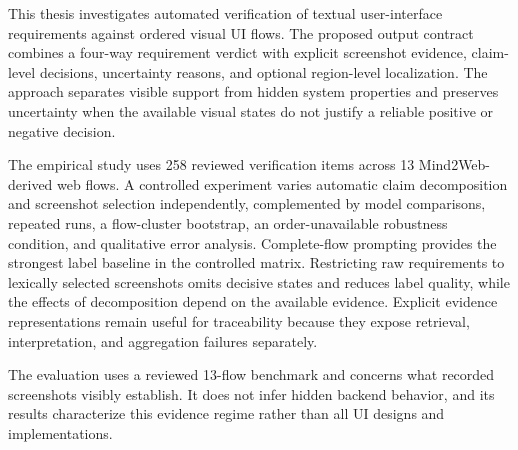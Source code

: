 
This thesis investigates automated verification of textual user-interface
requirements against ordered visual UI flows. The proposed output contract
combines a four-way requirement verdict with explicit screenshot evidence,
claim-level decisions, uncertainty reasons, and optional region-level
localization. The approach separates visible support from hidden system
properties and preserves uncertainty when the available visual states do not
justify a reliable positive or negative decision.

The empirical study uses 258 reviewed verification items across 13
Mind2Web-derived web flows. A controlled experiment varies automatic claim
decomposition and screenshot selection independently, complemented by model
comparisons, repeated runs, a flow-cluster bootstrap, an order-unavailable
robustness condition, and qualitative error analysis. Complete-flow prompting
provides the strongest label baseline in the controlled matrix. Restricting
raw requirements to lexically selected screenshots omits decisive states and
reduces label quality, while the effects of decomposition depend on the
available evidence. Explicit evidence representations remain useful for
traceability because they expose retrieval, interpretation, and aggregation
failures separately.

The evaluation uses a reviewed 13-flow benchmark and concerns what recorded
screenshots visibly establish. It does not infer hidden backend behavior, and
its results characterize this evidence regime rather than all UI designs and
implementations.
